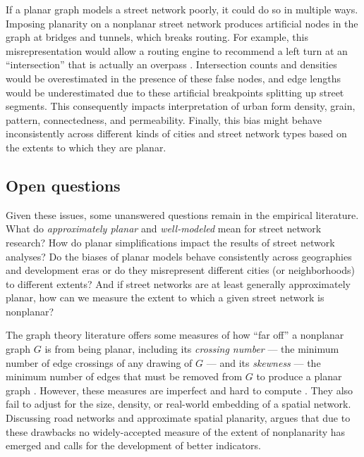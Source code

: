 \documentclass[Afour,sageh,times]{sagej}
\begin{document}
If a planar graph models a street network poorly, it could do so in multiple ways. Imposing planarity on a nonplanar street network produces artificial nodes in the graph at bridges and tunnels, which breaks routing. For example, this misrepresentation would allow a routing engine to recommend a left turn at an \enquote{intersection} that is actually an overpass \citep[p.~6]{kwan_review_1996}. Intersection counts and densities would be overestimated in the presence of these false nodes, and edge lengths would be underestimated due to these artificial breakpoints splitting up street segments. This consequently impacts interpretation of urban form density, grain, pattern, connectedness, and permeability. Finally, this bias might behave inconsistently across different kinds of cities and street network types based on the extents to which they are planar.

\subsection{Open questions}

Given these issues, some unanswered questions remain in the empirical literature. What do \emph{approximately planar} and \emph{well-modeled} mean for street network research? How do planar simplifications impact the results of street network analyses? Do the biases of planar models behave consistently across geographies and development eras or do they misrepresent different cities (or neighborhoods) to different extents? And if street networks are at least generally approximately planar, how can we measure the extent to which a given street network is nonplanar?

The graph theory literature offers some measures of how \enquote{far off} a nonplanar graph $G$ is from being planar, including its \emph{crossing number} --- the minimum number of edge crossings of any drawing of $G$ --- and its \emph{skewness} --- the minimum number of edges that must be removed from $G$ to produce a planar graph \citep{liebers_planarizing_2001,chimani_non-planar_2009}. However, these measures are imperfect and hard to compute \citep{szekely_successful_2004,chimani_vertex_2012}. They also fail to adjust for the size, density, or real-world embedding of a spatial network. Discussing road networks and approximate spatial planarity, \citet[p.~133]{newman_networks:_2010} argues that due to these drawbacks no widely-accepted measure of the extent of nonplanarity has emerged and calls for the development of better indicators.
\end{document}

